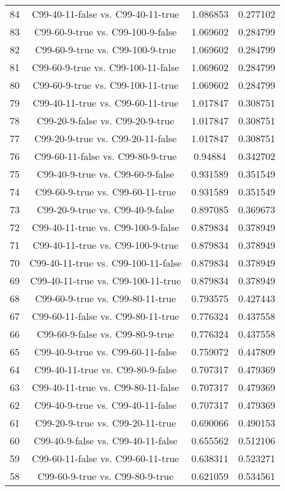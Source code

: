 \documentclass[a4paper,10pt]{article}
\begin{document}
\begin{landscape}
\begin{table}[!htp]
\begin{tabular}{cccc}
84&C99-40-11-false vs. C99-40-11-true&1.086853&0.277102\\
83&C99-60-9-true vs. C99-100-9-false&1.069602&0.284799\\
82&C99-60-9-true vs. C99-100-9-true&1.069602&0.284799\\
81&C99-60-9-true vs. C99-100-11-false&1.069602&0.284799\\
80&C99-60-9-true vs. C99-100-11-true&1.069602&0.284799\\
79&C99-40-11-true vs. C99-60-11-true&1.017847&0.308751\\
78&C99-20-9-false vs. C99-20-9-true&1.017847&0.308751\\
77&C99-20-9-true vs. C99-20-11-false&1.017847&0.308751\\
76&C99-60-11-false vs. C99-80-9-true&0.94884&0.342702\\
75&C99-40-9-true vs. C99-60-9-false&0.931589&0.351549\\
74&C99-60-9-true vs. C99-60-11-true&0.931589&0.351549\\
73&C99-20-9-true vs. C99-40-9-false&0.897085&0.369673\\
72&C99-40-11-true vs. C99-100-9-false&0.879834&0.378949\\
71&C99-40-11-true vs. C99-100-9-true&0.879834&0.378949\\
70&C99-40-11-true vs. C99-100-11-false&0.879834&0.378949\\
69&C99-40-11-true vs. C99-100-11-true&0.879834&0.378949\\
68&C99-60-9-true vs. C99-80-11-true&0.793575&0.427443\\
67&C99-60-11-false vs. C99-80-11-true&0.776324&0.437558\\
66&C99-60-9-false vs. C99-80-9-true&0.776324&0.437558\\
65&C99-40-9-true vs. C99-60-11-false&0.759072&0.447809\\
64&C99-40-11-true vs. C99-80-9-false&0.707317&0.479369\\
63&C99-40-11-true vs. C99-80-11-false&0.707317&0.479369\\
62&C99-40-9-true vs. C99-40-11-false&0.707317&0.479369\\
61&C99-20-9-true vs. C99-20-11-true&0.690066&0.490153\\
60&C99-40-9-false vs. C99-40-11-false&0.655562&0.512106\\
59&C99-60-11-false vs. C99-60-11-true&0.638311&0.523271\\
58&C99-60-9-true vs. C99-80-9-true&0.621059&0.534561\\

\end{tabular}
\end{table}
\end{landscape}
\end{document}
